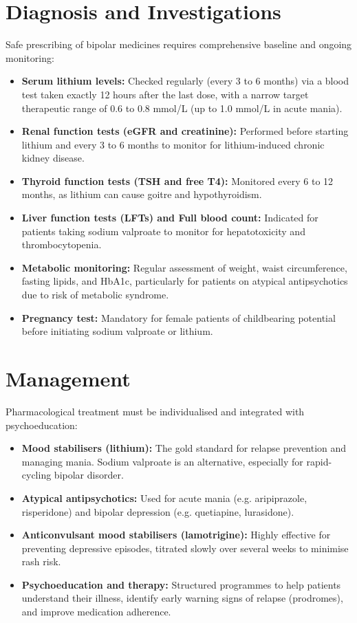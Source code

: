 \section*{Diagnosis and Investigations}
Safe prescribing of bipolar medicines requires comprehensive baseline and ongoing monitoring:
\begin{itemize}
    \item \textbf{Serum lithium levels:} Checked regularly (every 3 to 6 months) via a blood test taken exactly 12 hours after the last dose, with a narrow target therapeutic range of 0.6 to 0.8 mmol/L (up to 1.0 mmol/L in acute mania).
    \item \textbf{Renal function tests (eGFR and creatinine):} Performed before starting lithium and every 3 to 6 months to monitor for lithium-induced chronic kidney disease.
    \item \textbf{Thyroid function tests (TSH and free T4):} Monitored every 6 to 12 months, as lithium can cause goitre and hypothyroidism.
    \item \textbf{Liver function tests (LFTs) and Full blood count:} Indicated for patients taking sodium valproate to monitor for hepatotoxicity and thrombocytopenia.
    \item \textbf{Metabolic monitoring:} Regular assessment of weight, waist circumference, fasting lipids, and HbA1c, particularly for patients on atypical antipsychotics due to risk of metabolic syndrome.
    \item \textbf{Pregnancy test:} Mandatory for female patients of childbearing potential before initiating sodium valproate or lithium.
\end{itemize}

\section*{Management}
Pharmacological treatment must be individualised and integrated with psychoeducation:
\begin{itemize}
    \item \textbf{Mood stabilisers (lithium):} The gold standard for relapse prevention and managing mania. Sodium valproate is an alternative, especially for rapid-cycling bipolar disorder.
    \item \textbf{Atypical antipsychotics:} Used for acute mania (e.g. aripiprazole, risperidone) and bipolar depression (e.g. quetiapine, lurasidone).
    \item \textbf{Anticonvulsant mood stabilisers (lamotrigine):} Highly effective for preventing depressive episodes, titrated slowly over several weeks to minimise rash risk.
    \item \textbf{Psychoeducation and therapy:} Structured programmes to help patients understand their illness, identify early warning signs of relapse (prodromes), and improve medication adherence.
\end{itemize}

